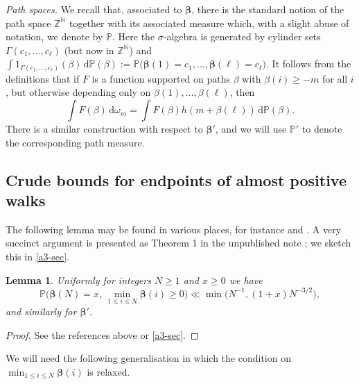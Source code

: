 \documentclass[11pt,reqno]{amsart}
\numberwithin{equation}{section}
\newtheorem{lemma}[theorem]{Lemma}
\theoremstyle{definition}
\theoremstyle{remark}
\newcommand{\mb}{\mathbb}
\def\boldbeta{\boldsymbol\beta}
\renewcommand{\le}{\leqslant}
\renewcommand{\ge}{\geqslant}
\newcommand\Z{\mathbb{Z}}
\newcommand\N{\mathbb{N}}
\begin{document}
\emph{Path spaces.} We recall that, associated to $\boldbeta$, there is the standard notion of the path space $\Z^{\N}$ together with its associated measure which, with a slight abuse of notation, we denote by $\mb{P}$. Here the $\sigma$-algebra is generated by cylinder sets $\Gamma(c_1,\dots, c_{\ell})$ (but now in $\Z^{\N}$) and $\int 1_{\Gamma(c_1,\dots, c_{\ell})}(\beta) \, \mathrm{d} \mb{P}(\beta) := \mb{P}\big(\boldbeta(1) = c_1,\dots, \boldbeta(\ell) = c_{\ell})$. It follows from the definitions that if $F$ is a function supported on paths $\beta$ with $\beta(i) \ge -m$ for all $i$, but otherwise depending only on $\beta(1),\dots, \beta(\ell)$, then 
\begin{equation}\label{doob-path} \int F(\beta) \, \mathrm{d} \omega_m = \int F(\beta) h(m + \beta(\ell)) \,\mathrm{d} \mb{P}(\beta).\end{equation}
There is a similar construction with respect to $\boldbeta'$, and we will use $\mb{P}'$ to denote the corresponding path measure.


\subsection{Crude bounds for endpoints of almost positive walks} 

The following lemma may be found in various places, for instance \cite[Lemma 20]{VW2009} and \cite{addario-berry-reed-1}. A very succinct argument is presented as Theorem 1 in the unpublished note \cite{addario-berry-reed-2}; we sketch this in \cref{a3-sec}.

\begin{lemma}\label{rand-walk-aux}
Uniformly for integers $N \ge 1$ and $x \ge 0$ we have
\[ \mb{P}\big(\boldbeta(N) = x, \, \min_{1 \le i \le N} \boldbeta(i) \ge 0\big) \ll \min \big(N^{-1}, (1 + x) N^{-3/2}\big),\] and similarly for $\boldbeta'$.
\end{lemma}\begin{proof} See the references above or \cref{a3-sec}.\end{proof}

We will need the following generalisation in which the condition on $\min_{1 \le i \le N} \boldbeta(i)$ is relaxed.
\end{document}
